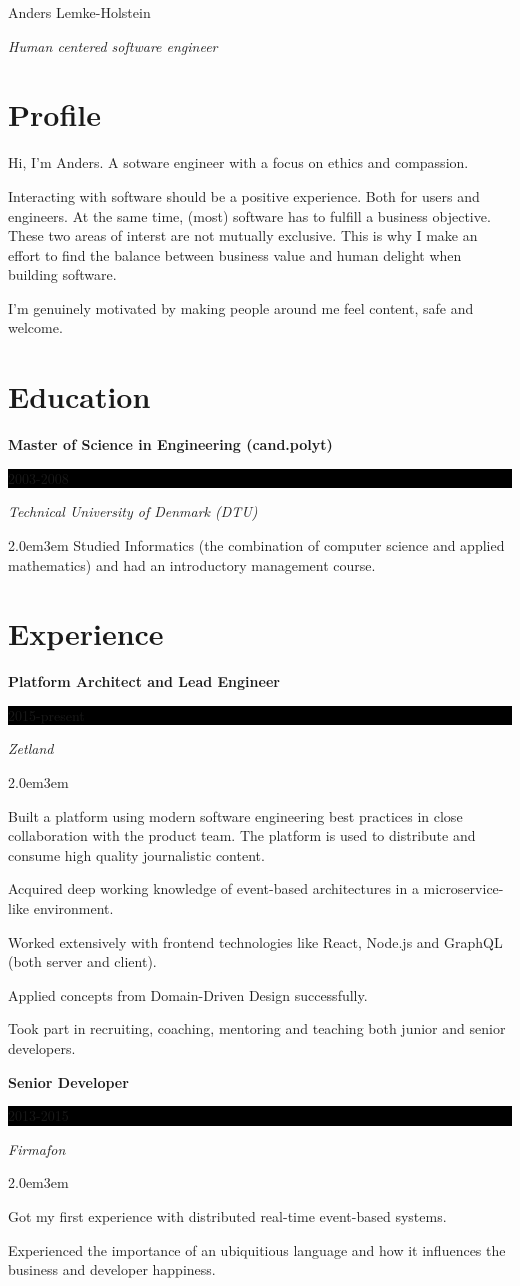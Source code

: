 \documentclass[paper=a4,fontsize=11pt]{scrartcl} %
\newcommand{\sepspace}{\vspace*{1em}}        %
\newcommand{\MyName}[1]{ %
  \begin{center}
    \Huge \usefont{OT1}{phv}{b}{n} #1
    \par \normalsize \normalfont
  \end{center}
  }
\newcommand{\MySlogan}[1]{ %
  \begin{center}
    \large \usefont{OT1}{phv}{m}{n} \textit{#1}
        \par \normalsize \normalfont
        \end{center}
        }
\newcommand{\NewPart}[1]{\section*{#1}}
\newcommand{\EducationEntry}[4]{
        \noindent \textbf{#1} \hfill      %
        \colorbox{Black}{%
            \parbox{6em}{%
            \hfill\color{White}#2}} \par  %
        \noindent \textit{#3} \par        %
        \begin{adjustwidth}{2.0em}{3em}
#4
        \end{adjustwidth}
        \sepspace
        \normalsize \par}
\begin{document}
{\selectfont

\MyName{Anders Lemke-Holstein}
\MySlogan{Human centered software engineer}

\NewPart{Profile}{}
Hi, I'm Anders. A sotware engineer with a focus on ethics and compassion.

Interacting with software should be a positive experience. Both for users and engineers. At the same time, (most) software has to fulfill a business objective. These two areas of interst are not mutually exclusive. This is why I make an effort to find the balance between business value and human delight when building software.

I'm genuinely motivated by making people around me feel content, safe and welcome.

\NewPart{Education}{}

\EducationEntry{Master of Science in Engineering (cand.polyt)}{2003-2008}{Technical University of Denmark (DTU)}{Studied Informatics (the combination of computer science and applied mathematics) and had an introductory management course.}

\NewPart{Experience}{}

\EducationEntry{Platform Architect and Lead Engineer}{2015-present}{Zetland}{
  Built a platform using modern software engineering best practices in close collaboration with the product team. The platform is used to distribute and consume high quality journalistic content.
  
  Acquired deep working knowledge of event-based architectures in a microservice-like environment.

  Worked extensively with frontend technologies like React, Node.js and GraphQL (both server and client).

  Applied concepts from Domain-Driven Design successfully.

  Took part in recruiting, coaching, mentoring and teaching both junior and senior developers.
}

\EducationEntry{Senior Developer}{2013-2015}{Firmafon}{
  Got my first experience with distributed real-time event-based systems.

  Experienced the importance of an ubiquitious language and how it influences the business and developer happiness.

}}
\end{document}
